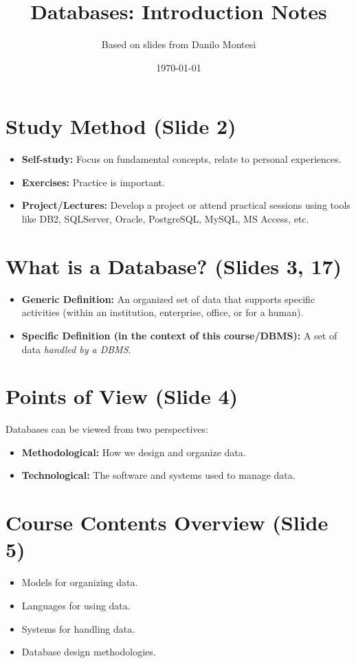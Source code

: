 \documentclass{article}
\title{Databases: Introduction Notes}
\author{Based on slides from Danilo Montesi}
\date{\today}
\begin{document}
	
	\maketitle
	
	\section{Study Method (Slide 2)}
	\begin{itemize}
		\item \textbf{Self-study:} Focus on fundamental concepts, relate to personal experiences.
		\item \textbf{Exercises:} Practice is important.
		\item \textbf{Project/Lectures:} Develop a project or attend practical sessions using tools like DB2, SQLServer, Oracle, PostgreSQL, MySQL, MS Access, etc.
	\end{itemize}
	
	\section{What is a Database? (Slides 3, 17)}
	\begin{itemize}
		\item \textbf{Generic Definition:} An organized set of data that supports specific activities (within an institution, enterprise, office, or for a human).
		\item \textbf{Specific Definition (in the context of this course/DBMS):} A set of data \emph{handled by a DBMS}.
	\end{itemize}
	
	\section{Points of View (Slide 4)}
	Databases can be viewed from two perspectives:
	\begin{itemize}
		\item \textbf{Methodological:} How we design and organize data.
		\item \textbf{Technological:} The software and systems used to manage data.
	\end{itemize}
	
	\section{Course Contents Overview (Slide 5)}
	\begin{itemize}
		\item Models for organizing data.
		\item Languages for using data.
		\item Systems for handling data.
		\item Database design methodologies.
	\end{itemize}
	
\end{document}
